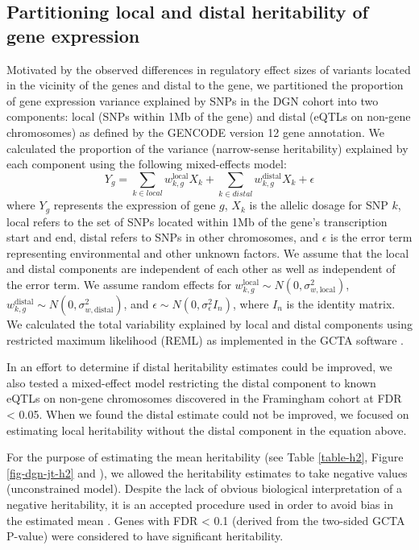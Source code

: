 \documentclass[10pt,letterpaper]{article}
\begin{document}
\subsection*{Partitioning local and distal heritability of gene
expression}\label{partitioning-local-and-distal-heritability-of-gene-expression}

Motivated by the observed differences in regulatory effect sizes of variants located in the vicinity of the genes and distal to the gene,
we partitioned the proportion of gene expression variance explained by
SNPs in the DGN cohort into two components: local (SNPs within 1Mb of
the gene) and distal (eQTLs on non-gene chromosomes) as defined by the
GENCODE \cite{Harrow_2012} version 12 gene annotation. We calculated the
proportion of the variance (narrow-sense heritability) explained by each
component using the following mixed-effects model:
%
\[ Y_g = \sum_{k  \in local}w^\text{local}_{k,g} X_k + \sum_{k  \in distal}w^\text{distal}_{k,g} X_k + \epsilon \]
%
where $Y_g$ represents the expression of gene $g$, $X_k$ is the allelic dosage for SNP $k$, local refers to the set of SNPs located within 1Mb of the gene's transcription start and end, distal refers to SNPs in other chromosomes, and $\epsilon$ is the error term representing environmental and other unknown factors. We assume that the local and distal components are independent of each other as well as independent of the error term.
We assume random effects for \(w^\text{local}_{k,g} \sim N(0, \sigma^2_{w,\text{local}})\), \(w^\text{distal}_{k,g} \sim N(0, \sigma^2_{w,\text{distal}})\), and
\(\epsilon \sim N(0, \sigma^2_{\epsilon} I_n)\), where \(I_n\) is the
identity matrix. We calculated the total variability explained by local
and distal components using restricted
maximum likelihood (REML) as implemented in the GCTA software \cite{Yang_2011}. 

In an effort to determine if distal heritability estimates could be improved, we also tested a mixed-effect model restricting the distal component to known eQTLs on non-gene chromosomes discovered in the Framingham cohort at FDR \textless{} 0.05. When we found the distal estimate could not be improved, we focused on estimating local heritability without the distal component in the equation above.

For the purpose of estimating the mean heritability (see Table \ref{table-h2}, Figure \ref{fig-dgn-jt-h2} and ), we allowed the heritability estimates to 
take negative values (unconstrained model). Despite the lack of obvious biological interpretation of a negative heritability, 
it is an accepted procedure used in order to avoid bias in the estimated mean \cite{Price_2011,Wright_2014}. Genes with FDR \textless{} 0.1 (derived from the two-sided GCTA P-value) were considered to have significant heritability. 
\end{document}

